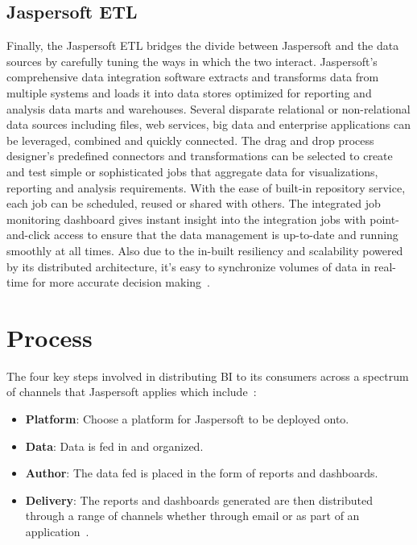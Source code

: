 \subsection{Jaspersoft ETL}
Finally, the Jaspersoft ETL bridges the divide between Jaspersoft and the data
sources by carefully tuning the ways in which the two interact. Jaspersoft's
comprehensive data integration software extracts and transforms data from
multiple systems and loads it into data stores optimized for reporting and
analysis data marts and warehouses. Several disparate relational or
non-relational data sources including files, web services, big data and
enterprise applications can be leveraged, combined and quickly connected. The
drag and drop process designer's predefined connectors and transformations can
be selected to create and test simple or sophisticated jobs that aggregate data
for visualizations, reporting and analysis requirements. With the ease of
built-in repository service, each job can be scheduled, reused or shared with
others. The integrated job monitoring dashboard gives instant insight into the
integration jobs with point-and-click access to ensure that the data management
is up-to-date and running smoothly at all times. Also due to the in-built
resiliency and scalability powered by its distributed architecture, it's easy to
synchronize volumes of data in real-time for more accurate decision
making~\cite{hid-sp18-516-www-data-integration}.


\section{Process}

The four key steps involved in distributing BI to its consumers across a
spectrum of channels that Jaspersoft applies which include~\cite{hid-sp18-516-www-quick-start-video}:
\begin{itemize} \item \textbf{Platform}: Choose a platform for Jaspersoft to be deployed onto.
\item \textbf{Data}: Data is fed in and organized. 
\item \textbf{Author}: The data fed is placed in the form of reports and dashboards.
\item \textbf{Delivery}: The reports and dashboards generated are then distributed
through a range of channels whether through email or as part of an
application~\cite{hid-sp18-516-www-quick-start-video}. \end{itemize}


